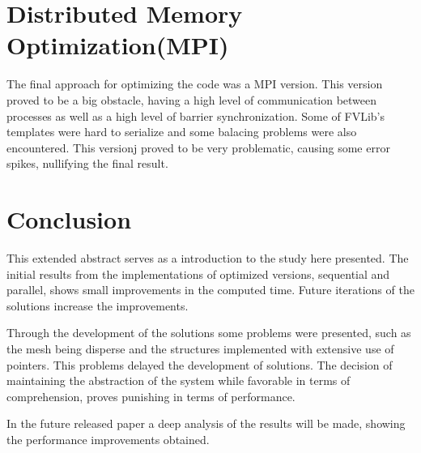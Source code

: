 \documentclass[a4paper,10pt,openright,openbib,twocolumn]{article}
\begin{document}
\section{Distributed Memory Optimization(MPI)}

The final approach for optimizing the code was a MPI version. This version proved to be a big obstacle, having a high level of communication between processes as well as a high level of barrier synchronization. Some of FVLib's templates were hard to serialize and some balacing problems were also encountered. This versionj proved to be very problematic, causing some error spikes, nullifying the final result.


\section{Conclusion}

This extended abstract serves as a introduction to the study here presented. The initial results from the implementations of optimized versions, sequential and parallel, shows small improvements in the computed time. Future iterations of the solutions increase the improvements.

Through the development of the solutions some problems were presented, such as the mesh being disperse and the structures implemented with extensive use of pointers. This problems delayed the development of solutions. The decision of maintaining the abstraction of the system while favorable in terms of comprehension, proves punishing in terms of performance.

In the future released paper a deep analysis of the results will be made, showing the performance improvements obtained.
\end{document}
